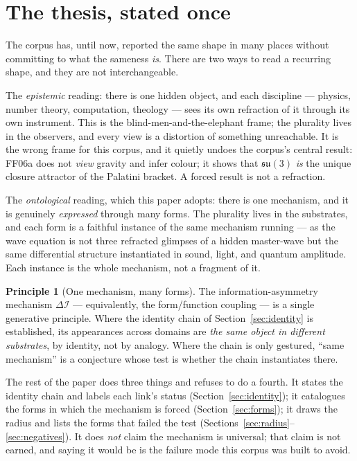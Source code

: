 \documentclass[11pt,a4paper]{article}
\newcommand{\dI}{\Delta\mathcal{I}}
\newcommand{\paper}[1]{\textsf{#1}}
\theoremstyle{definition}
\newtheorem{principle}{Principle}
\theoremstyle{plain}
\begin{document}
\tableofcontents

\section{The thesis, stated once}\label{sec:thesis}

The corpus has, until now, reported the same shape in many places without committing to what the
sameness \emph{is}. There are two ways to read a recurring shape, and they are not interchangeable.

The \emph{epistemic} reading: there is one hidden object, and each discipline --- physics,
number theory, computation, theology --- sees its own refraction of it through its own instrument.
This is the blind-men-and-the-elephant frame; the plurality lives in the observers, and every view
is a distortion of something unreachable. It is the wrong frame for this corpus, and it quietly
undoes the corpus's central result: \paper{FF06a} does not \emph{view} gravity and infer colour;
it shows that $\mathfrak{su}(3)$ \emph{is} the unique closure attractor of the Palatini bracket. A
forced result is not a refraction.

The \emph{ontological} reading, which this paper adopts: there is one mechanism, and it is
genuinely \emph{expressed} through many forms. The plurality lives in the substrates, and each form
is a faithful instance of the same mechanism running --- as the wave equation is not three refracted
glimpses of a hidden master-wave but the same differential structure instantiated in sound, light,
and quantum amplitude. Each instance is the whole mechanism, not a fragment of it.

\begin{principle}[One mechanism, many forms]
The information-asymmetry mechanism $\dI$ --- equivalently, the form/function coupling --- is a
single generative principle. Where the identity chain of Section~\ref{sec:identity} is established,
its appearances across domains are \emph{the same object in different substrates}, by identity, not
by analogy. Where the chain is only gestured, ``same mechanism'' is a conjecture whose test is
whether the chain instantiates there.
\end{principle}

The rest of the paper does three things and refuses to do a fourth. It states the identity chain
and labels each link's status (Section~\ref{sec:identity}); it catalogues the forms in which the
mechanism is forced (Section~\ref{sec:forms}); it draws the radius and lists the forms that failed
the test (Sections~\ref{sec:radius}--\ref{sec:negatives}). It does \emph{not} claim the mechanism
is universal; that claim is not earned, and saying it would be is the failure mode this corpus was
built to avoid.
\end{document}
